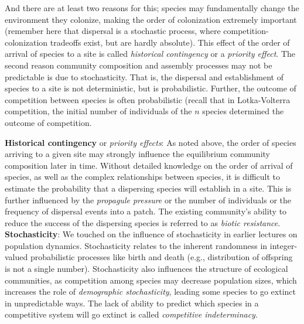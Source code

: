 \documentclass[12pt]{article}
\begin{document}
And there are at least two reasons for this; species may fundamentally change the environment they colonize, making the order of colonization extremely important (remember here that dispersal is a stochastic process, where competition-colonization tradeoffs exist, but are hardly absolute). This effect of the order of arrival of species to a site is called \textit{historical contingency} or a \textit{priority effect}. The second reason community composition and assembly processes may not be predictable is due to stochasticity. That is, the dispersal and establishment of species to a site is not deterministic, but is probabilistic. Further, the outcome of competition between species is often probabilistic (recall that in Lotka-Volterra competition, the initial number of individuals of the $n$ species determined the outcome of competition. 


\textbf{Historical contingency} or \textit{priority effects}: As noted above, the order of species arriving to a given site may strongly influence the equilibrium community composition later in time. Without detailed knowledge on the order of arrival of species, as well as the complex relationships between species, it is difficult to estimate the probability that a dispersing species will establish in a site. This is further influenced by the \textit{propagule pressure} or the number of individuals or the frequency of dispersal events into a patch. The existing community's ability to reduce the success of the dispersing species is referred to as \textit{biotic resistance}.\\ 


\textbf{Stochasticity}: We touched on the influence of stochasticity in earlier lectures on population dynamics. Stochasticity relates to the inherent randomness in integer-valued probabilistic processes like birth and death (e.g., distribution of offspring is not a single number). Stochasticity also influences the structure of ecological communities, as competition among species may decrease population sizes, which increases the role of \textit{demographic stochasticity}, leading some species to go extinct in unpredictable ways. The lack of ability to predict which species in a competitive system will go extinct is called \textit{competitive indeterminacy}. \\ 
\end{document}
